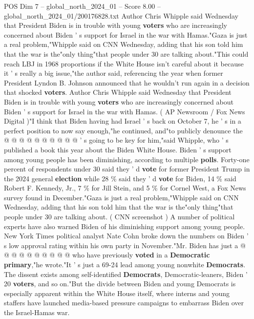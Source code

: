 \begin{textsample}{POS Dim 7 – global\_north\_2024\_01 – Score 8.00 – global\_north\_2024\_01/200176828.txt}  \label{ex:f7_pos_192}
Author Chris Whipple said Wednesday that President Biden is in trouble with young \textbf{voters} who are increasingly concerned about Biden ' s support for Israel in the war with Hamas."Gaza is just a real problem,"Whipple said on CNN Wednesday, adding that his son told him that the war is the"only thing"that people under 30 are talking about."This could reach LBJ in 1968 proportions if the White House isn't careful about it because it ' s really a big issue,"the author said, referencing the year when former President Lyndon B.
Johnson announced that he wouldn't run again in a decision that shocked \textbf{voters}.
Author Chris Whipple said Wednesday that President Biden is in trouble with young \textbf{voters} who are increasingly concerned about Biden ' s support for Israel in the war with Hamas. ( AP Newsroom / Fox News Digital )"I think that Biden having had Israel ' s back on October 7, he ' s in a perfect position to now say enough,"he continued, and"to publicly denounce the @ @ @ @ @ @ @ @ @ @ ' s going to be key for him,"said Whipple, who ' s published a book this year about the Biden White House.
Biden ' s support among young people has been diminishing, according to multiple \textbf{polls}.
Forty-one percent of respondents under 30 said they ' d \textbf{vote} for former President Trump in the 2024 general \textbf{election} while 28 \% said they ' d \textbf{vote} for Biden, 14 \% said Robert F.
Kennedy, Jr., 7 \% for Jill Stein, and 5 \% for Cornel West, a Fox News survey found in December."Gaza is just a real problem,"Whipple said on CNN Wednesday, adding that his son told him that the war is the"only thing"that people under 30 are talking about. ( CNN screenshot ) A number of political experts have also warned Biden of his diminishing support among young people.
New York Times political analyst Nate Cohn broke down the numbers on Biden ' s low approval rating within his own party in November."Mr.
Biden has just a @ @ @ @ @ @ @ @ @ @ who have previously \textbf{voted} in a \textbf{Democratic} \textbf{primary},"he wrote."It ' s just a 69-24 lead among young nonwhite \textbf{Democrats}.
The dissent exists among self-identified \textbf{Democrats}, Democratic-leaners, Biden ' 20 \textbf{voters}, and so on."But the divide between Biden and young Democrats is especially apparent within the White House itself, where interns and young staffers have launched media-based pressure campaigns to embarrass Biden over the Israel-Hamas war.

\end{textsample}
